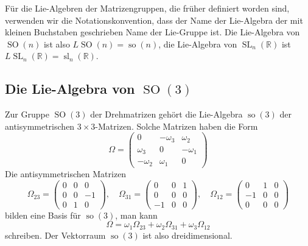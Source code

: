 Für die Lie-Algebren der Matrizengruppen, die früher definiert worden
sind, verwenden wir die Notationskonvention, dass der Name der
Lie-Algebra der mit kleinen Buchstaben geschrieben Name der Lie-Gruppe ist.
Die Lie-Algebra von $\operatorname{SO}(n)$ ist also
$L\operatorname{SO}(n) = \operatorname{so}(n)$,
%
die Lie-Algebra von $\operatorname{SL}_n(\mathbb{R})$ ist
$L\operatorname{SL}_n(\mathbb{R})=\operatorname{sl}_n(\mathbb{R})$.
%

%
%
\subsection{Die Lie-Algebra von $\operatorname{SO}(3)$
\label{buch:subsection:die-lie-algebra-von-so3}}
Zur Gruppe $\operatorname{SO}(3)$ der Drehmatrizen gehört die Lie-Algebra
$\operatorname{so}(3)$ der antisymmetrischen $3\times 3$-Matrizen.
Solche Matrizen haben die Form
\[
\Omega
=
\begin{pmatrix}
    0    &-\omega_3& \omega_2\\
 \omega_3&   0     &-\omega_1\\
-\omega_2& \omega_1&    0
\end{pmatrix}
\]
Die antisymmetrischen Matrizen
\[
\Omega_{23}
=
\begin{pmatrix} 0&0&0\\0&0&-1\\0&1&0\end{pmatrix},
\quad
\Omega_{31}
=
\begin{pmatrix} 0&0&1\\0&0&0\\-1&0&0\end{pmatrix},
\quad
\Omega_{12}
=
\begin{pmatrix} 0&1&0\\-1&0&0\\0&0&0\end{pmatrix}
\]
bilden eine Basis für $\operatorname{so}(3)$, man kann
\[
\Omega
=
\omega_1\Omega_{23}
+
\omega_2\Omega_{31}
+
\omega_3\Omega_{12}
\]
schreiben.
Der Vektorraum $\operatorname{so}(3)$ ist also dreidimensional.


